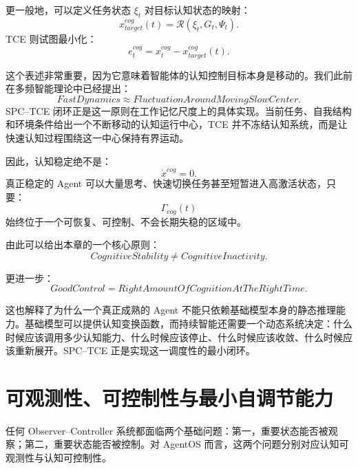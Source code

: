 更一般地，可以定义任务状态 $\xi_t$ 对目标认知状态的映射：
\begin{equation}
x_{target}^{cog}(t)
=
\mathcal R
\left(
\xi_t,
G_t,
\Psi_t
\right).
\end{equation}
TCE 则试图最小化：
\begin{equation}
e_t^{cog}
=
x_t^{cog}
-
x_{target}^{cog}(t).
\end{equation}

这个表述非常重要，因为它意味着智能体的认知控制目标本身是移动的。我们此前在多频智能理论中已经提出：
\begin{equation}
FastDynamics
\approx
FluctuationAroundMovingSlowCenter.
\end{equation}
SPC--TCE 闭环正是这一原则在工作记忆尺度上的具体实现。当前任务、自我结构和环境条件给出一个不断移动的认知运行中心，TCE 并不冻结认知系统，而是让快速认知过程围绕这一中心保持有界运动。

因此，认知稳定绝不是：
\begin{equation}
\dot{x}^{cog}=0.
\end{equation}
真正稳定的 Agent 可以大量思考、快速切换任务甚至短暂进入高激活状态，只要：
\begin{equation}
\Gamma_{cog}(t)
\end{equation}
始终位于一个可恢复、可控制、不会长期失稳的区域中。

由此可以给出本章的一个核心原则：
\begin{equation}
\boxed{
CognitiveStability
\neq
CognitiveInactivity.
}
\end{equation}

更进一步：
\begin{equation}
\boxed{
GoodControl
=
RightAmountOfCognition
AtTheRightTime.
}
\end{equation}

这也解释了为什么一个真正成熟的 Agent 不能只依赖基础模型本身的静态推理能力。基础模型可以提供认知变换函数，而持续智能还需要一个动态系统决定：什么时候应该调用多少认知能力、什么时候应该停止、什么时候应该收敛、什么时候应该重新展开。SPC--TCE 正是实现这一调度性的最小闭环。

\section{可观测性、可控制性与最小自调节能力}

任何 Observer--Controller 系统都面临两个基础问题：第一，重要状态能否被观察；第二，重要状态能否被控制。对 AgentOS 而言，这两个问题分别对应认知可观测性与认知可控制性。

